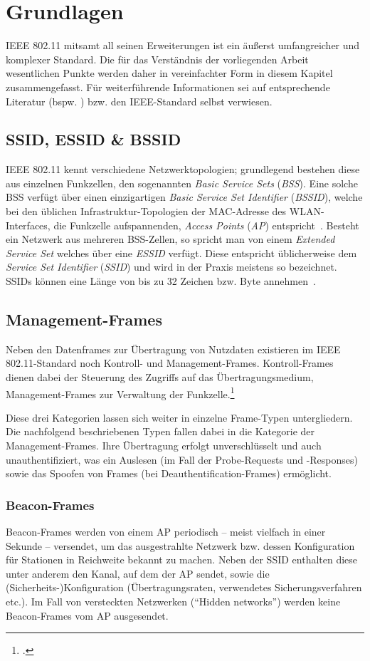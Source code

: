 \section{Grundlagen}\label{sec:grundlagen}
IEEE 802.11 mitsamt all seinen Erweiterungen ist ein äußerst umfangreicher und komplexer Standard. 
Die für das Verständnis der vorliegenden Arbeit wesentlichen Punkte werden daher in vereinfachter Form in diesem Kapitel zusammengefasst. 
Für weiterführende Informationen sei auf entsprechende Literatur (bspw. \cite{rechWLAN}) bzw. den IEEE-Standard selbst verwiesen.

\subsection{SSID, ESSID \& BSSID}
IEEE 802.11 kennt verschiedene Netzwerktopologien; grundlegend bestehen diese aus einzelnen Funkzellen, den sogenannten \textit{Basic Service Sets} (\textit{BSS}). 
Eine solche BSS verfügt über einen einzigartigen \textit{Basic Service Set Identifier} (\textit{BSSID}), welche bei den üblichen Infrastruktur-Topologien der MAC-Adresse des WLAN-Interfaces, die Funkzelle aufspannenden, \textit{Access Points} (\textit{AP}) entspricht~\cite[S. 51]{rechWLAN}. 
Besteht ein Netzwerk aus mehreren BSS-Zellen, so spricht man von einem \textit{Extended Service Set} welches über eine \textit{ESSID} verfügt. 
Diese entspricht üblicherweise dem \textit{Service Set Identifier} (\textit{SSID}) und wird in der Praxis meistens so bezeichnet. 
SSIDs können eine Länge von bis zu 32 Zeichen bzw. Byte annehmen~\cite{netgearESSID}.

\subsection{Management-Frames}
Neben den Datenframes zur Übertragung von Nutzdaten existieren im IEEE 802.11-Standard noch Kontroll- und Management-Frames. 
Kontroll-Frames dienen dabei der Steuerung des Zugriffs auf das Übertragungsmedium, Management-Frames zur Verwaltung der Funkzelle.\footcite[S. 180]{rechWLAN}

Diese drei Kategorien lassen sich weiter in einzelne Frame-Typen untergliedern. 
Die nachfolgend beschriebenen Typen fallen dabei in die Kategorie der Management-Frames. 
Ihre Übertragung erfolgt unverschlüsselt und auch unauthentifiziert, was ein Auslesen (im Fall der Probe-Requests und -Responses) sowie das Spoofen von Frames (bei Deauthentification-Frames) ermöglicht.

\subsubsection{Beacon-Frames}
Beacon-Frames werden von einem AP periodisch -- meist vielfach in einer Sekunde -- versendet, um das ausgestrahlte Netzwerk bzw. dessen Konfiguration für Stationen in Reichweite bekannt zu machen. 
Neben der SSID enthalten diese unter anderem den Kanal, auf dem der AP sendet, sowie die (Sicherheits-)Konfiguration (Übertragungsraten, verwendetes Sicherungsverfahren etc.). 
Im Fall von versteckten Netzwerken (\enquote{Hidden networks}) werden keine Beacon-Frames vom AP ausgesendet.

